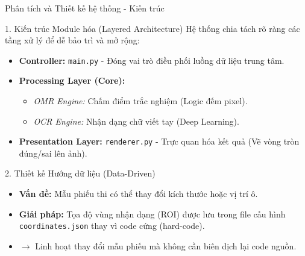 \documentclass[10pt, aspectratio=169]{beamer}
\begin{document}
	\begin{frame}{Phân tích và Thiết kế hệ thống - Kiến trúc}
		
		\begin{block}{1. Kiến trúc Module hóa (Layered Architecture)}
			Hệ thống chia tách rõ ràng các tầng xử lý để dễ bảo trì và mở rộng:
			\begin{itemize}
				\setlength\itemsep{0.5em} %
				\item \textbf{Controller:} \texttt{main.py} - Đóng vai trò điều phối luồng dữ liệu trung tâm.
				\item \textbf{Processing Layer (Core):} 
				\begin{itemize}
					\item \textit{OMR Engine:} Chấm điểm trắc nghiệm (Logic đếm pixel).
					\item \textit{OCR Engine:} Nhận dạng chữ viết tay (Deep Learning).
				\end{itemize}
				\item \textbf{Presentation Layer:} \texttt{renderer.py} - Trực quan hóa kết quả (Vẽ vòng tròn đúng/sai lên ảnh).
			\end{itemize}
		\end{block}
		
		\begin{alertblock}{2. Thiết kế Hướng dữ liệu (Data-Driven)}
			\begin{itemize}
				\item \textbf{Vấn đề:} Mẫu phiếu thi có thể thay đổi kích thước hoặc vị trí ô.
				\item \textbf{Giải pháp:} Tọa độ vùng nhận dạng (ROI) được lưu trong file cấu hình \texttt{coordinates.json} thay vì code cứng (hard-code).
				\item $\rightarrow$ Linh hoạt thay đổi mẫu phiếu mà không cần biên dịch lại code nguồn.
			\end{itemize}
		\end{alertblock}
		
	\end{frame}
	
\end{document}
